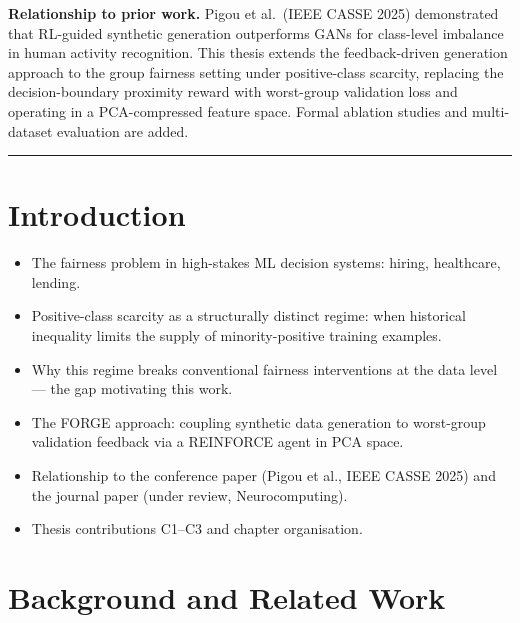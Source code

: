 \documentclass[12pt]{article}
\begin{document}
\vspace{0.5em}
\noindent\textbf{Relationship to prior work.}
Pigou et al.\ (IEEE CASSE 2025) demonstrated that RL-guided synthetic
generation outperforms GANs for class-level imbalance in human activity
recognition. This thesis extends the feedback-driven generation approach to
the group fairness setting under positive-class scarcity, replacing the
decision-boundary proximity reward with worst-group validation loss and
operating in a PCA-compressed feature space. Formal ablation studies and
multi-dataset evaluation are added.

\vspace{1em}
\hrule
\vspace{1em}

\section{Introduction}

\begin{itemize}
    \item The fairness problem in high-stakes ML decision systems: hiring,
          healthcare, lending.
    \item Positive-class scarcity as a structurally distinct regime: when
          historical inequality limits the supply of minority-positive training
          examples.
    \item Why this regime breaks conventional fairness interventions at the
          data level --- the gap motivating this work.
    \item The FORGE approach: coupling synthetic data generation to worst-group
          validation feedback via a REINFORCE agent in PCA space.
    \item Relationship to the conference paper (Pigou et al., IEEE CASSE 2025)
          and the journal paper (under review, Neurocomputing).
    \item Thesis contributions C1--C3 and chapter organisation.
\end{itemize}

\section{Background and Related Work}
\end{document}
